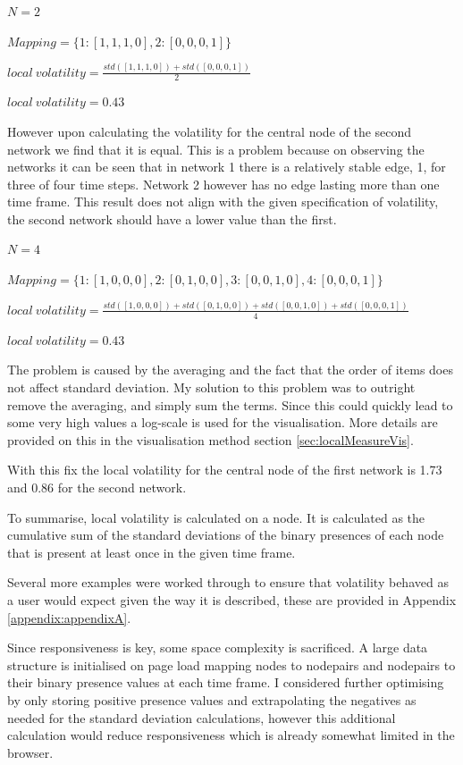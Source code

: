 \begin{center}
$N = 2$

$Mapping = \{1:[1, 1, 1, 0], 2:[0, 0, 0, 1]\}$

$local\ volatility = \frac{std([1,1,1,0]) + std([0,0,0,1])}{2}$

$local\ volatility = 0.43$
\end{center}

However upon calculating the volatility for the central node of the second network we find that it is equal. This is a problem because on observing the networks it can be seen that in network 1 there is a relatively stable edge, 1, for three of four time steps. Network 2 however has no edge lasting more than one time frame. This result does not align with the given specification of volatility, the second network should have a lower value than the first.

\begin{center}
$N = 4$

$Mapping = \{1:[1, 0, 0, 0], 2:[0, 1, 0, 0], 3: [0, 0, 1, 0], 4: [0, 0, 0, 1]\}$

$local\ volatility = \frac{std([1,0,0,0]) + std([0,1,0,0]) + std([0,0,1,0]) + std([0,0,0,1])}{4}$

$local\ volatility = 0.43$
\end{center}

The problem is caused by the averaging and the fact that the order of items does not affect standard deviation. My solution to this problem was to outright remove the averaging, and simply sum the terms. Since this could quickly lead to some very high values a log-scale is used for the visualisation. More details are provided on this in the visualisation method section \ref{sec:localMeasureVis}.  

With this fix the local volatility for the central node of the first network is 1.73 and 0.86 for the second network. 

To summarise, local volatility is calculated on a node. It is calculated as the cumulative sum of the standard deviations of the binary presences of each node that is present at least once in the given time frame.

Several more examples were worked through to ensure that volatility behaved as a user would expect given the way it is described, these are provided in Appendix \ref{appendix:appendixA}.

Since responsiveness is key, some space complexity is sacrificed. A large data structure is initialised on page load mapping nodes to nodepairs and nodepairs to their binary presence values at each time frame.
I considered further optimising by only storing positive presence values and extrapolating the negatives as needed for the standard deviation calculations, however this additional calculation would reduce responsiveness which is already somewhat limited in the browser.

